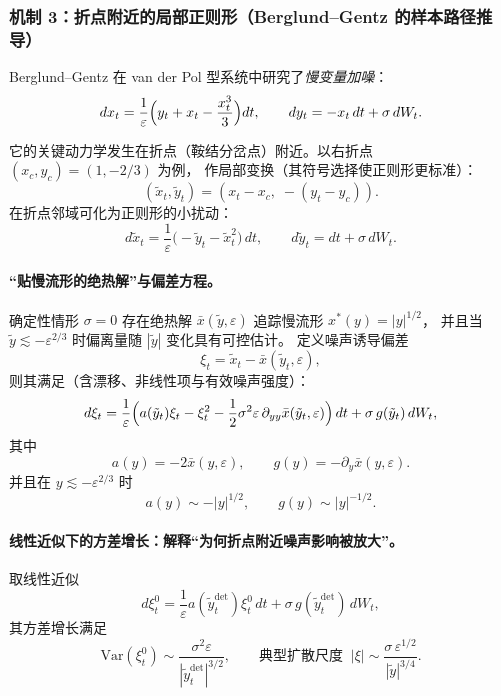 \documentclass[a4paper,twoside,openany,UTF8]{article}  %
\numberwithin{equation}{section}  %
\numberwithin{equation}{section}  %
\begin{document}
\subsubsection{机制 3：折点附近的局部正则形（Berglund--Gentz 的样本路径推导）}
Berglund--Gentz 在 van der Pol 型系统中研究了\emph{慢变量加噪}：
\begin{equation}\label{eq:BG-619}
	dx_t=\frac{1}{\varepsilon}\Bigl(y_t+x_t-\frac{x_t^3}{3}\Bigr)dt,\qquad
	dy_t=-x_t\,dt+\sigma\,dW_t .
\end{equation}

它的关键动力学发生在折点（鞍结分岔点）附近。以右折点 $(x_c,y_c)=(1,-2/3)$ 为例，
作局部变换（其符号选择使正则形更标准）：
\[
(\tilde x_t,\tilde y_t)=(x_t-x_c,\; -(y_t-y_c)).
\]
在折点邻域可化为正则形的小扰动：
\begin{equation}\label{eq:BG-620}
	d\tilde x_t=\frac{1}{\varepsilon}\bigl(-\tilde y_t-\tilde x_t^2\bigr)\,dt,\qquad
	d\tilde y_t=dt+\sigma\,dW_t .
\end{equation}

\paragraph{“贴慢流形的绝热解”与偏差方程。}
确定性情形 $\sigma=0$ 存在绝热解 $\bar x(\tilde y,\varepsilon)$ 追踪慢流形 $x^\ast(y)=|y|^{1/2}$，
并且当 $\tilde y\lesssim -\varepsilon^{2/3}$ 时偏离量随 $|\tilde y|$ 变化具有可控估计。
定义噪声诱导偏差
\[
\xi_t=\tilde x_t-\bar x(\tilde y_t,\varepsilon),
\]
则其满足（含漂移、非线性项与有效噪声强度）：
\begin{equation}\label{eq:BG-621}
	d\xi_t=\frac{1}{\varepsilon}\Bigl(a(\tilde y_t)\xi_t-\xi_t^2-\frac{1}{2}\sigma^2\varepsilon\,\partial_{yy}\bar x(\tilde y_t,\varepsilon)\Bigr)\,dt
	+\sigma\,g(\tilde y_t)\,dW_t,
\end{equation}
其中
\begin{equation}\label{eq:BG-622-623}
	a(y)=-2\bar x(y,\varepsilon),\qquad g(y)=-\partial_y\bar x(y,\varepsilon).
\end{equation}
并且在 $y\lesssim -\varepsilon^{2/3}$ 时
\[
a(y)\sim -|y|^{1/2},\qquad g(y)\sim |y|^{-1/2}.
\]

\paragraph{线性近似下的方差增长：解释“为何折点附近噪声影响被放大”。}
取线性近似
\begin{equation}\label{eq:BG-624}
	d\xi^{0}_t=\frac{1}{\varepsilon}a(\tilde y^{\mathrm{det}}_t)\xi^{0}_t\,dt+\sigma\,g(\tilde y^{\mathrm{det}}_t)\,dW_t,
\end{equation}
其方差增长满足
\[
\mathrm{Var}(\xi^{0}_t)\sim \frac{\sigma^2\varepsilon}{|\tilde y^{\mathrm{det}}_t|^{3/2}},
\qquad
\text{典型扩散尺度 }\ |\xi|\sim \frac{\sigma\,\varepsilon^{1/2}}{|\tilde y|^{3/4}}.
\]
\end{document}
